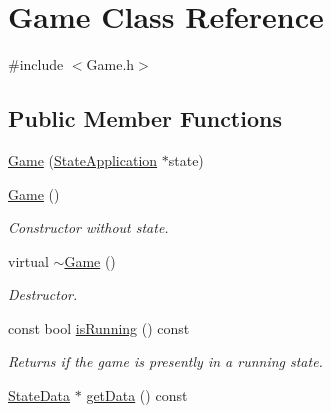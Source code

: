 \hypertarget{class_game}{\section{Game Class Reference}
\label{class_game}
}


{\ttfamily \#include $<$Game.\-h$>$}

\subsection*{Public Member Functions}
\begin{DoxyCompactItemize}
\item 
\hyperlink{class_game_a09f1b8c714816ee634939b73fe08622d}{Game} (\hyperlink{class_state_application}{State\-Application} $\ast$state)
\item 
\hypertarget{class_game_ad59df6562a58a614fda24622d3715b65}{\hyperlink{class_game_ad59df6562a58a614fda24622d3715b65}{Game} ()}\label{class_game_ad59df6562a58a614fda24622d3715b65}

\begin{DoxyCompactList}\small\item\em Constructor without state. \end{DoxyCompactList}\item 
\hypertarget{class_game_ae3d112ca6e0e55150d2fdbc704474530}{virtual \hyperlink{class_game_ae3d112ca6e0e55150d2fdbc704474530}{$\sim$\-Game} ()}\label{class_game_ae3d112ca6e0e55150d2fdbc704474530}

\begin{DoxyCompactList}\small\item\em Destructor. \end{DoxyCompactList}\item 
\hypertarget{class_game_aa61c0358c2611d00eb47ebf72a88f8c7}{const bool \hyperlink{class_game_aa61c0358c2611d00eb47ebf72a88f8c7}{is\-Running} () const }\label{class_game_aa61c0358c2611d00eb47ebf72a88f8c7}

\begin{DoxyCompactList}\small\item\em Returns if the game is presently in a running state. \end{DoxyCompactList}\item 
\hypertarget{class_game_ac405429a34ce63322174063442040259}{\hyperlink{struct_state_data}{State\-Data} $\ast$ \hyperlink{class_game_ac405429a34ce63322174063442040259}{get\-Data} () const }\label{class_game_ac405429a34ce63322174063442040259}


\end{DoxyCompactItemize}
